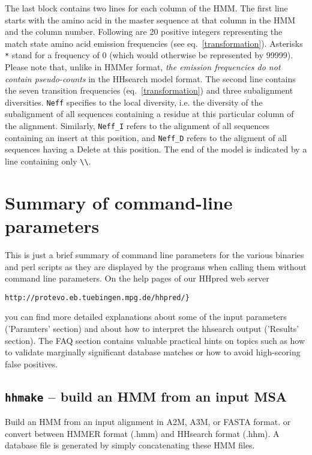 \documentclass[11pt,a4paper]{article}
\begin{document}
The last block contains two lines for each column of the HMM. The first line starts with the amino acid in the master sequence at that column in the HMM and the column number. Following are 20  positive integers representing the match state amino acid emission frequencies (see eq.\ \ref{transformation}). Asterisks \verb`*` stand for a frequency of 0 (which would otherwise be represented by 99999). Please note that, unlike in HMMer format,  \emph{the emission frequencies do not contain pseudo-counts} in the HHsearch model format. The second line contains the seven transition frequencies (eq.\ \ref{transformation}) and three subalignment diversities. \verb`Neff` specifies to the local diversity, i.e. the diversity of the subalignment of all sequences containing a residue at this particular column of the alignment. Similarly, \verb`Neff_I` refers to the alignment of all sequences containing an insert at this position, and \verb`Neff_D` refers to the aligment of all sequences having a Delete at this position. The end of the model is indicated by a line containing only \verb`\\`. 


\section{Summary of command-line parameters}

This is just a brief summary of command line parameters for the various binaries and
perl scripts as they are displayed by the programs when calling them without 
command line parameters. On the help pages of our HHpred web server 
\begin{verbatim}
http://protevo.eb.tuebingen.mpg.de/hhpred/}
\end{verbatim}
you can find more detailed explanations about some of the input parameters 
('Paramters' section) and about how to interpret the hhsearch output ('Results' 
section). The FAQ section contains valuable practical hints on topics such as how to 
validate marginally significant database matches or how to avoid high-scoring false 
positives.

\subsection{{\tt hhmake} -- build an HMM from an input MSA}

Build an HMM from an input alignment in A2M, A3M, or FASTA format.   
or convert between HMMER format (.hmm) and HHsearch format (.hhm).   
A database file is generated by simply concatenating these HMM files.
\end{document}
